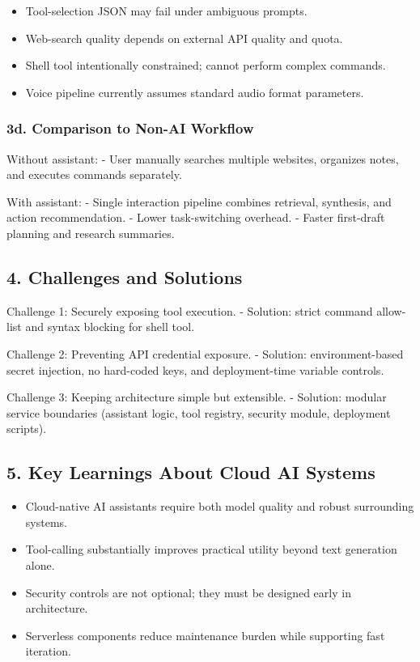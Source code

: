 \documentclass[
]{article}
\providecommand{\tightlist}{%
  \setlength{\itemsep}{0pt}\setlength{\parskip}{0pt}}
\begin{document}
\begin{itemize}
\tightlist
\item
  Tool-selection JSON may fail under ambiguous prompts.
\item
  Web-search quality depends on external API quality and quota.
\item
  Shell tool intentionally constrained; cannot perform complex commands.
\item
  Voice pipeline currently assumes standard audio format parameters.
\end{itemize}

\subsubsection{3d. Comparison to Non-AI
Workflow}\label{d.-comparison-to-non-ai-workflow}

Without assistant: - User manually searches multiple websites, organizes
notes, and executes commands separately.

With assistant: - Single interaction pipeline combines retrieval,
synthesis, and action recommendation. - Lower task-switching overhead. -
Faster first-draft planning and research summaries.

\subsection{4. Challenges and Solutions}\label{challenges-and-solutions}

Challenge 1: Securely exposing tool execution. - Solution: strict
command allow-list and syntax blocking for shell tool.

Challenge 2: Preventing API credential exposure. - Solution:
environment-based secret injection, no hard-coded keys, and
deployment-time variable controls.

Challenge 3: Keeping architecture simple but extensible. - Solution:
modular service boundaries (assistant logic, tool registry, security
module, deployment scripts).

\subsection{5. Key Learnings About Cloud AI
Systems}\label{key-learnings-about-cloud-ai-systems}

\begin{itemize}
\tightlist
\item
  Cloud-native AI assistants require both model quality and robust
  surrounding systems.
\item
  Tool-calling substantially improves practical utility beyond text
  generation alone.
\item
  Security controls are not optional; they must be designed early in
  architecture.
\item
  Serverless components reduce maintenance burden while supporting fast
  iteration.
\end{itemize}
\end{document}
